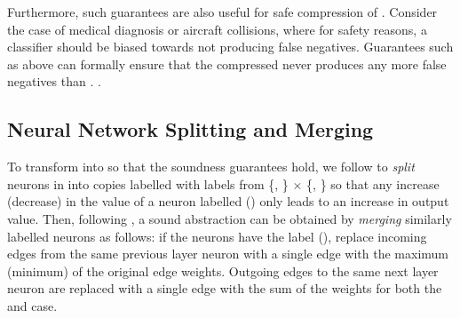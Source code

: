 Furthermore, such guarantees are also useful for safe compression of \dnn.
Consider the case of medical diagnosis or aircraft collisions, where
for safety reasons, a classifier should be biased towards not producing false
negatives. Guarantees such as above can formally ensure that the compressed \abs
never produces any more false negatives than \cnc. .

\subsection{Neural Network Splitting and Merging}





To transform \cnc into \abs so that the soundness guarantees hold, we follow
\cite{cegar-nn} to \textit{split} neurons in \cnc into copies labelled with
labels from \{\inc, \dec\} $\times$ \{\posc, \negc\} so that any
increase (decrease) in the value of a neuron labelled
\inc (\dec) only leads to an increase in output value. Then,
following \cite{cegar-nn}, a sound abstraction can be obtained by
\textit{merging} similarly labelled neurons as follows: if the neurons have the
label \inc (\dec), replace incoming edges from the same
previous layer neuron with a single edge with the maximum (minimum) of the
original edge weights. Outgoing edges to the same next layer neuron are replaced
with a single edge with the sum of the weights for both the \inc and \dec case.

